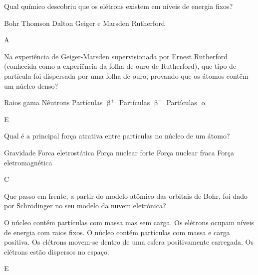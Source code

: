 \documentclass[9 pt]{scrartcl}
\def\PQ{0.84} %
\begin{document}
\begin{exercise}[points=\PQ]
Qual químico descobriu que os elétrons existem em níveis de energia fixos?
\begin{choice}
\choice Bohr
\choice Thomson
\choice Dalton
\choice Geiger e Marsden
\choice Rutherford
\end{choice}
\end{exercise}
\begin{solution}
A
\end{solution}


\begin{exercise}[points=\PQ]
Na experiência de Geiger-Marsden supervisionada por Ernest Rutherford (conhecida como a experiência da folha de ouro de Rutherford), que tipo de partícula foi dispersada por uma folha de ouro, provando que os átomos contêm um núcleo denso?

\begin{choice}
\choice Raios gama
\choice Nêutrons
\choice Partículas \(\upbeta^+\)
\choice Partículas \(\upbeta^-\)
\choice Partículas \(\upalpha\)
\end{choice}
\end{exercise}

\begin{solution}
E
\end{solution}

\begin{exercise}[points=\PQ]
Qual é a principal força atrativa entre partículas no núcleo de um átomo?

\begin{choice}
\choice Gravidade
\choice Forca eletrostática
\choice Força nuclear forte
\choice Força nuclear fraca
\choice Força eletromagnética
\end{choice}
\end{exercise}
\begin{solution}
C
\end{solution}

\begin{exercise}[points=\PQ]
Que passo em frente, a partir do modelo atômico das orbitais de Bohr, foi dado por Schrödinger no seu modelo da nuvem eletrónica?

\begin{choice}
\choice O núcleo contém partículas com massa mas sem carga.
\choice Os elétrons ocupam níveis de energia com raios fixos.
\choice O núcleo contém partículas com massa e carga positiva.
\choice Os elétrons movem-se dentro de uma esfera positivamente carregada.
\choice Os elétrons estão dispersos no espaço.
\end{choice}
\end{exercise}
\begin{solution}
E
\end{solution}
\end{document}
